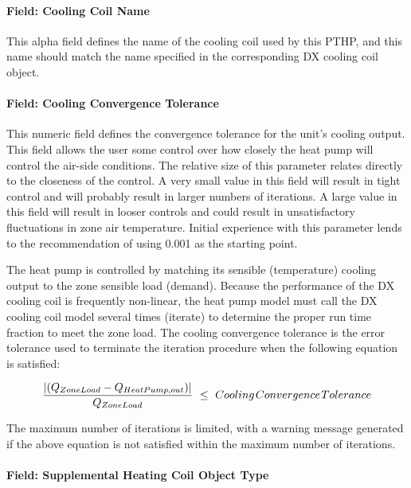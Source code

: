 \paragraph{Field: Cooling Coil Name}\label{field-cooling-coil-name-3-000}

This alpha field defines the name of the cooling coil used by this PTHP, and this name should match the name specified in the corresponding DX cooling coil object.

\paragraph{Field: Cooling Convergence Tolerance}\label{field-cooling-convergence-tolerance-3}

This numeric field defines the convergence tolerance for the unit's cooling output. This field allows the user some control over how closely the heat pump will control the air-side conditions. The relative size of this parameter relates directly to the closeness of the control. A very small value in this field will result in tight control and will probably result in larger numbers of iterations. A large value in this field will result in looser controls and could result in unsatisfactory fluctuations in zone air temperature. Initial experience with this parameter lends to the recommendation of using 0.001 as the starting point.

The heat pump is controlled by matching its sensible (temperature) cooling output to the zone sensible load (demand). Because the performance of the DX cooling coil is frequently non-linear, the heat pump model must call the DX cooling coil model several times (iterate) to determine the proper run time fraction to meet the zone load. The cooling convergence tolerance is the error tolerance used to terminate the iteration procedure when the following equation is satisfied:

\begin{equation}
\frac{{\left| {({Q_{ZoneLoad}} - {Q_{HeatPump,out}})} \right|}}{{{Q_{ZoneLoad}}}}\,\, \le \,\,Cooling{\kern 1pt} Convergence{\kern 1pt} Tolerance
\end{equation}

The maximum number of iterations is limited, with a warning message generated if the above equation is not satisfied within the maximum number of iterations.

\paragraph{Field: Supplemental Heating Coil Object Type}\label{field-supplemental-heating-coil-object-type-000}

